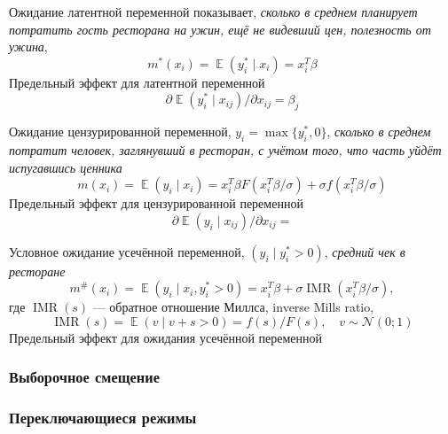 \documentclass[12pt]{article}
\DeclareMathOperator{\IMR}{IMR} %
\DeclareMathOperator{\E}{\mathbb{E}}
\newcommand{\cN}{\mathcal{N}}
\begin{document}
Ожидание латентной переменной показывает, \emph{сколько в среднем планирует потратить гость ресторана на ужин, ещё не видевший цен, полезность от ужина},
\[
m^*(x_i) = \E(y^*_i \mid  x_i) = x_i^T \beta
\]
Предельный эффект для латентной переменной 
\[
\partial \E(y^*_i \mid  x_{ij})/ \partial x_{ij} = \beta_j
\]


Ожидание цензурированной переменной, $y_i = \max\{ y_i^*, 0 \}$, \emph{сколько в среднем потратит человек, заглянувший в ресторан, с учётом того, что часть уйдёт испугавшись ценника}
\[
m(x_i) = \E(y_i \mid  x_i) = x_i^T \beta F(x_i^T \beta /\sigma) + \sigma f(x_i^T \beta / \sigma)
\]
Предельный эффект для цензурированной переменной 
\[
\partial \E(y_i \mid  x_{ij})/ \partial x_{ij} = 
\]


Условное ожидание усечённой переменной, $(y_i \mid y_i^* > 0)$, \emph{средний чек в ресторане}
\[
m^\#(x_i) = \E(y_i \mid x_i, y_i^* > 0) = x_i^T \beta  + \sigma \IMR(x_i^T \beta / \sigma),
\]
где $\IMR(s)$ — обратное отношение Миллса, inverse Mills ratio,
\[
\IMR(s) = \E(v \mid v + s > 0) = f(s) / F(s), \quad v\sim \cN(0;1)
\]
Предельный эффект для ожидания усечённой переменной


\subsubsection*{Выборочное смещение}


\subsubsection*{Переключающиеся режимы}
\end{document}
